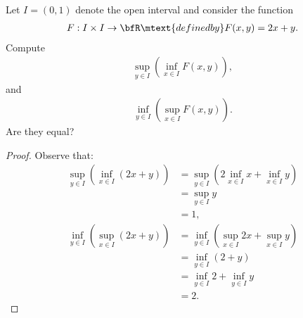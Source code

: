 \documentclass[10pt,twoside,openany]{memoir}
\begin{document}
    \begin{exercise}
        Let $I = (0,1)$ denote the open interval and consider the function
            \begin{equation*}
            \begin{split}
                F:I \times I \rightarrow \bfR \mtext{defined by} F(x,y) = 2x + y.
            \end{split}
            \end{equation*}
        Compute
            \begin{equation*}
            \begin{split}
                \sup_{y \in I} \left(\inf_{x \in I} F(x,y)\right),
            \end{split}
            \end{equation*}
        and
            \begin{equation*}
            \begin{split}
                \inf_{y \in I} \left(\sup_{x \in I} F(x,y)\right).
            \end{split}
            \end{equation*}
        Are they equal?
    \end{exercise}
        {\color{red} \begin{proof}
            Observe that:
                \begin{equation*}
                \begin{split}
                    \sup_{y \in I}\left(\inf_{x \in I}(2x+y)\right)
                    & = \sup_{y \in I}\left(2\inf_{x \in I}x+\inf_{x \in I}y\right) \\
                    & = \sup_{y \in I}y \\
                    & = 1,
                \end{split}
                \end{equation*}
                \begin{equation*}
                \begin{split}
                    \inf_{y \in I}\left(\sup_{x \in I}(2x+y)\right)
                    & = \inf_{y \in I} \left( \sup_{x \in I}2x + \sup_{x \in I}y\right) \\
                    & = \inf_{y \in I} \left( 2 + y\right) \\
                    & = \inf_{y \in I}2 + \inf_{y \in I}y \\
                    & = 2.
                \end{split}
                \end{equation*}
        \end{proof}}
\end{document}
